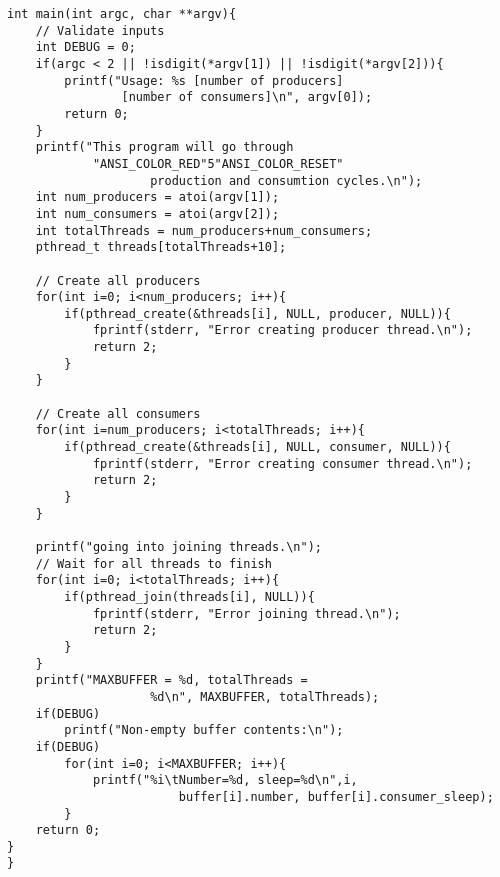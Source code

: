 \documentclass[journal,10pt,onecolumn,compsoc,letterpaper,draftclsnofoot,table,xcdraw]{IEEEtran} \usepackage[margin=0.75in]{geometry}
\begin{document}
\begin{verbatim}
int main(int argc, char **argv){
	// Validate inputs
	int DEBUG = 0;
	if(argc < 2 || !isdigit(*argv[1]) || !isdigit(*argv[2])){
		printf("Usage: %s [number of producers] 
        		[number of consumers]\n", argv[0]);
		return 0;
	}
	printf("This program will go through 
    		"ANSI_COLOR_RED"5"ANSI_COLOR_RESET" 
            		production and consumtion cycles.\n");
	int num_producers = atoi(argv[1]);
	int num_consumers = atoi(argv[2]);
	int totalThreads = num_producers+num_consumers;
	pthread_t threads[totalThreads+10];

	// Create all producers
	for(int i=0; i<num_producers; i++){
		if(pthread_create(&threads[i], NULL, producer, NULL)){
			fprintf(stderr, "Error creating producer thread.\n");
			return 2;
		}
	}

	// Create all consumers
	for(int i=num_producers; i<totalThreads; i++){
		if(pthread_create(&threads[i], NULL, consumer, NULL)){
			fprintf(stderr, "Error creating consumer thread.\n");
			return 2;
		}
	}

	printf("going into joining threads.\n");
	// Wait for all threads to finish
	for(int i=0; i<totalThreads; i++){
		if(pthread_join(threads[i], NULL)){
			fprintf(stderr, "Error joining thread.\n");
			return 2;
		}
	}
	printf("MAXBUFFER = %d, totalThreads = 
    				%d\n", MAXBUFFER, totalThreads);
	if(DEBUG)
		printf("Non-empty buffer contents:\n");
	if(DEBUG)
		for(int i=0; i<MAXBUFFER; i++){
			printf("%i\tNumber=%d, sleep=%d\n",i, 
            			buffer[i].number, buffer[i].consumer_sleep);
		}
	return 0;
}
}
\end{verbatim}
\end{document}
